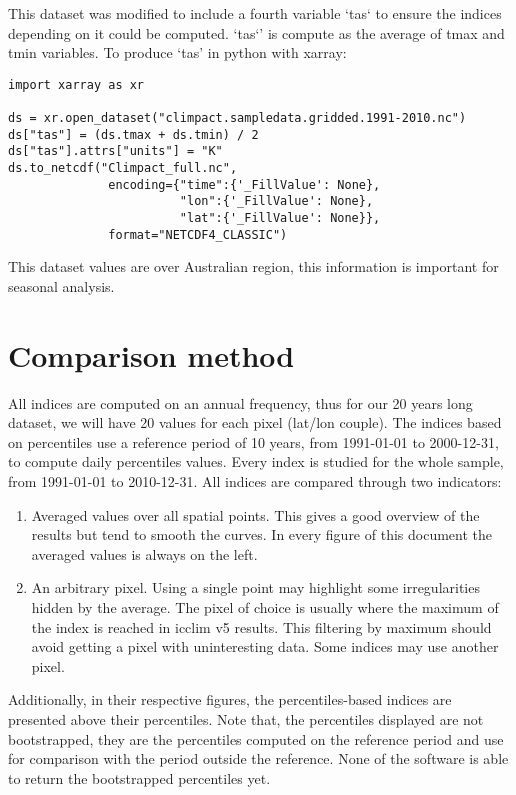 \documentclass[a4paper,11pt]{article}
\begin{document}
        This dataset was modified to include a fourth variable `tas` to ensure the indices depending on it could be computed.
        `tas`' is compute as the average of tmax and tmin variables.
        To produce `tas' in python with xarray:
        \begin{minipage}{\linewidth}
        \begin{lstlisting}
import xarray as xr

ds = xr.open_dataset("climpact.sampledata.gridded.1991-2010.nc")
ds["tas"] = (ds.tmax + ds.tmin) / 2
ds["tas"].attrs["units"] = "K"
ds.to_netcdf("Climpact_full.nc",
              encoding={"time":{'_FillValue': None},
                        "lon":{'_FillValue': None},
                        "lat":{'_FillValue': None}},
              format="NETCDF4_CLASSIC")
        \end{lstlisting}
        \end{minipage}

        This dataset values are over Australian region, this information is important for seasonal analysis.

    \section{Comparison method}
        All indices are computed on an annual frequency, thus for our 20 years long dataset, we will have 20 values for each pixel (lat/lon couple).
        The indices based on percentiles use a reference period of 10 years, from 1991-01-01 to 2000-12-31, to compute daily percentiles values.
        Every index is studied for the whole sample, from 1991-01-01 to 2010-12-31.
        All indices are compared through two indicators: 
        \begin{enumerate}
            \item Averaged values over all spatial points. 
                This gives a good overview of the results but tend to smooth the curves. In every figure of this document the averaged values is always on the left.
            \item An arbitrary pixel. 
                Using a single point may highlight some irregularities hidden by the average. 
                The pixel of choice is usually where the maximum of the index is reached in icclim v5 results. 
                This filtering by maximum should avoid getting a pixel with uninteresting data. Some indices may use another pixel.
        \end{enumerate}
        Additionally, in their respective figures, the percentiles-based indices are presented above their percentiles. 
        Note that, the percentiles displayed are not bootstrapped, they are the percentiles computed on the reference period and use for comparison with the period outside the reference. 
        None of the software is able to return the bootstrapped percentiles yet.\\
        
\end{document}
